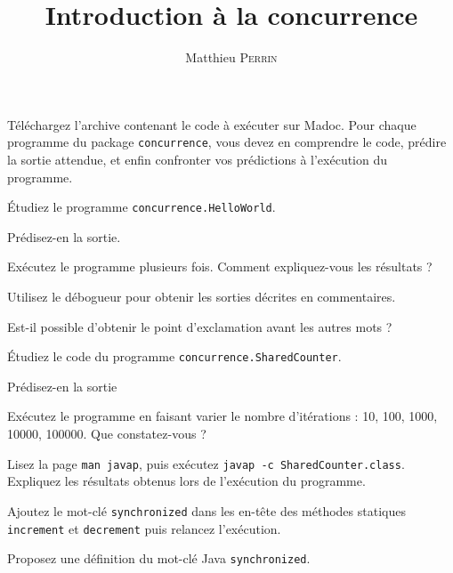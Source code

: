 \documentclass{td}
\author{Matthieu \textsc{Perrin}}
\title{Introduction à la concurrence}
\begin{document}
\maketitle

Téléchargez l'archive contenant le code à exécuter sur Madoc.
Pour chaque programme du package \linebreak\texttt{concurrence}, vous devez en comprendre le code,
prédire la sortie attendue, et enfin confronter vos prédictions
à l'exécution du programme.


\begin{exercice}[Asynchronie]

  Étudiez le programme \texttt{concurrence.HelloWorld}.

  \begin{question} 
  \item Prédisez-en la sortie.
  \item Exécutez le programme plusieurs fois. Comment expliquez-vous les résultats ?
  \item Utilisez le débogueur pour obtenir les sorties décrites en commentaires.
  \item Est-il possible d’obtenir le point d'exclamation avant les autres mots ?
  \end{question}
  
\end{exercice}


\begin{exercice}

  Étudiez le code du programme \texttt{concurrence.SharedCounter}.

  \begin{question} 
  \item Prédisez-en la sortie
  \item Exécutez le programme en faisant varier le nombre d'itérations :
    10, 100, 1000, 10000, 100000. Que constatez-vous ?
  \item Lisez la page \texttt{man javap}, puis exécutez
    \texttt{javap -c SharedCounter.class}. Expliquez les résultats
    obtenus lors de l'exécution du programme.
  \item Ajoutez le mot-clé \lstinline{synchronized} dans les en-tête des méthodes statiques \lstinline{increment} et \lstinline{decrement} puis relancez l'exécution.
  \item Proposez une définition du mot-clé Java \lstinline{synchronized}.
  \end{question}

\end{exercice}
\end{document}
